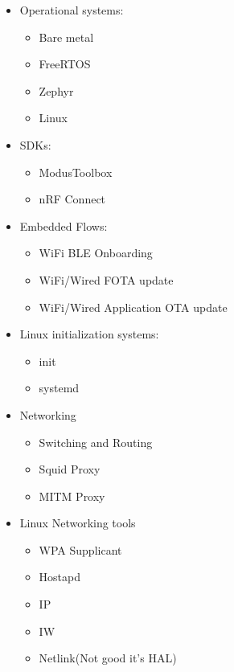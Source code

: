 \begin{itemize}
    \item Operational systems:
    \begin{itemize}
        \item Bare metal
        \item FreeRTOS
        \item Zephyr
        \item Linux
    \end{itemize}

    \item SDKs:
    \begin{itemize}
        \item ModusToolbox
        \item nRF Connect
    \end{itemize}

    \item Embedded Flows:
    \begin{itemize}
        \item WiFi BLE Onboarding
        \item WiFi/Wired FOTA update
        \item WiFi/Wired Application OTA update
    \end{itemize}

    \item Linux initialization systems:
    \begin{itemize}
        \item init
        \item systemd
    \end{itemize}

    \item Networking
    \begin{itemize}
        \item Switching and Routing
        \item Squid Proxy
        \item MITM Proxy
    \end{itemize}

    \item Linux Networking tools
    \begin{itemize}
        \item WPA Supplicant
        \item Hostapd
        \item IP
        \item IW
        \item Netlink(Not good it's HAL)
    \end{itemize}


\end{itemize}
